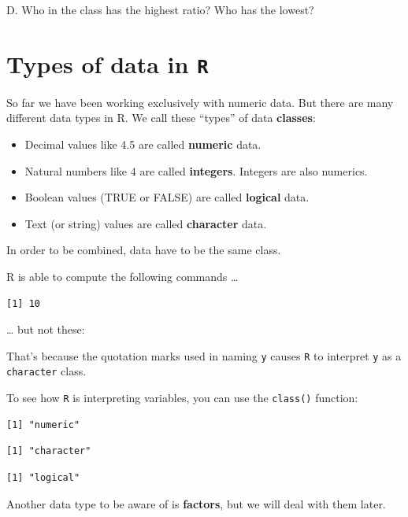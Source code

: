 \documentclass[
]{book}
\providecommand{\tightlist}{%
  \setlength{\itemsep}{0pt}\setlength{\parskip}{0pt}}
\begin{document}
D. Who in the class has the highest ratio? Who has the lowest?

\hypertarget{types-of-data-in-r}{%
\section*{\texorpdfstring{Types of data in \texttt{R}}{Types of data in R}}\label{types-of-data-in-r}}

So far we have been working exclusively with numeric data. But there are many different data types in R. We call these ``types'' of data \textbf{classes}:

\begin{itemize}
\tightlist
\item
  Decimal values like 4.5 are called \textbf{numeric} data.
\item
  Natural numbers like 4 are called \textbf{integers}. Integers are also numerics.
\item
  Boolean values (TRUE or FALSE) are called \textbf{logical} data.
\item
  Text (or string) values are called \textbf{character} data.
\end{itemize}

In order to be combined, data have to be the same class.

R is able to compute the following commands \ldots{}

\begin{verbatim}
[1] 10
\end{verbatim}

\ldots{} but not these:

That's because the quotation marks used in naming \texttt{y} causes \texttt{R} to interpret \texttt{y} as a \texttt{character} class.

To see how \texttt{R} is interpreting variables, you can use the \texttt{class()} function:

\begin{verbatim}
[1] "numeric"
\end{verbatim}

\begin{verbatim}
[1] "character"
\end{verbatim}

\begin{verbatim}
[1] "logical"
\end{verbatim}

Another data type to be aware of is \textbf{factors}, but we will deal with them later.
\end{document}
